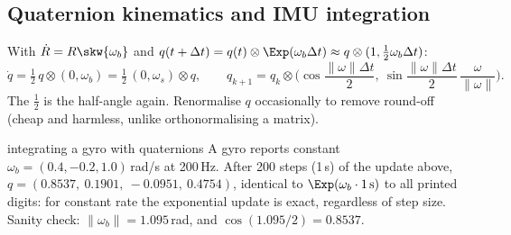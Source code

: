 \subsection{Quaternion kinematics and IMU integration}\label{sec:rot:quaternion-kinematics-imu}
With $\dot R=R\skw{\omega_b}$ and $q(t+\Delta t)=q(t)\otimes\Exp(\omega_b\Delta t)\approx q\otimes(1,\tfrac12\omega_b\Delta t)$:
\[
\dot q=\tfrac12\,q\otimes(0,\omega_b)=\tfrac12\,(0,\omega_s)\otimes q,\qquad q_{k+1}=q_k\otimes\Big(\cos\frac{\|\omega\|\Delta t}2,\ \sin\frac{\|\omega\|\Delta t}2\,\frac{\omega}{\|\omega\|}\Big).
\]
The $\frac12$ is the half-angle again. Renormalise $q$ occasionally to remove round-off (cheap and harmless, unlike orthonormalising a matrix).

\begin{example}{integrating a gyro with quaternions}
A gyro reports constant $\omega_b=(0.4,-0.2,1.0)$\,rad/s at 200\,Hz. After 200 steps (1\,s) of the update above, $q=(0.8537,\ 0.1901,\ -0.0951,\ 0.4754)$, identical to $\Exp(\omega_b\cdot1\,\text{s})$ to all printed digits: for constant rate the exponential update is exact, regardless of step size. Sanity check: $\|\omega_b\|=1.095$\,rad, and $\cos(1.095/2)=0.8537$.
\end{example}
